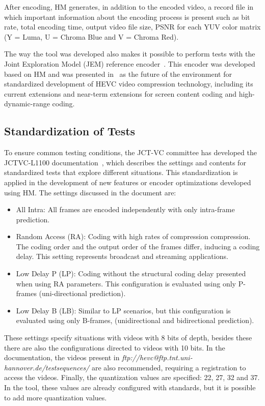 \documentclass{acm_proc_article-sp}
\begin{document}
After encoding, HM generates, in addition to the encoded video, a record file in which important information about the encoding process is present such as bit rate, total encoding time, output video file size, PSNR for each YUV color matrix (Y = Luma, U = Chroma Blue and V = Chroma Red).


The way the tool was developed also makes it possible to perform tests with the Joint Exploration Model (JEM) reference encoder~\cite{Bossen:17}. This encoder was developed based on HM and was presented in~\cite{JVET:2015} as the future of the environment for standardized development of HEVC video compression technology, including its current extensions and near-term extensions for screen content coding and high-dynamic-range coding.


\subsection{Standardization of Tests}

To ensure common testing conditions, the JCT-VC committee has developed the JCTVC-L1100 documentation~\cite{Bossen:13}, which describes the settings and contents for standardized tests that explore different situations. This standardization is applied in the development of new features or encoder optimizations developed using HM. The settings discussed in the document are:

\begin{itemize}

  \item All Intra: All frames are encoded independently with only intra-frame prediction.
  \item Random Access (RA): Coding with high rates of compression compression. The coding order and the output order of the frames differ, inducing a coding delay. This setting represents broadcast and streaming applications.
  \item Low Delay P (LP): Coding without the structural coding delay presented when using RA parameters. This configuration is evaluated using only P-frames (uni-directional prediction).
  \item Low Delay B (LB): Similar to LP scenarios, but this configuration is evaluated using only B-frames, (unidirectional and bidirectional prediction).

\end{itemize}

These settings specify situations with videos with 8 bits of depth, besides these there are also the configurations directed to videos with 10 bits. In the documentation, the videos present in \emph{ftp://hevc@ftp.tnt.uni-hannover.de/testsequences/} are also recommended, requiring a registration to access the videos. Finally, the quantization values are specified: 22, 27, 32 and 37. In the tool, these values are already configured with standards, but it is possible to add more quantization values.
\end{document}
